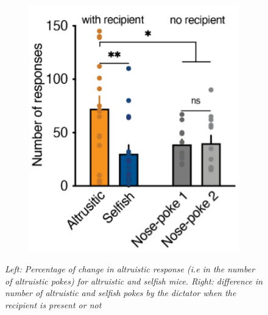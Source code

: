\documentclass[12pt, a4paper]{report}
\begin{document}
\begin{figure}[H]
\begin{minipage}{\linewidth}
\begin{minipage}{0.46\linewidth}
\begin{figure}[H]
			\end{figure}
		\end{minipage}
		\hspace{0.05\linewidth}
		\begin{minipage}{0.46\linewidth}
			\begin{figure}[H]
				\includegraphics[width=\linewidth]{norecip.png}
				
			\end{figure}
		\end{minipage}
		
	\end{minipage}
	\caption{\textit{Left: Percentage of change in altruistic response (i.e in the number of altruistic pokes) for altruistic and selfish mice. Right: difference in number of altruistic and selfish pokes by the dictator when the recipient is present or not}} \label{altr_first}
\end{figure}
\end{document}
